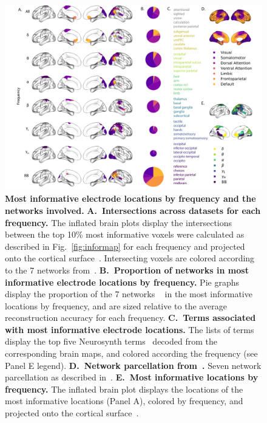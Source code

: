 \documentclass[11pt]{article}
\begin{document}
\begin{figure}
  \centering
  \includegraphics[width=\textwidth]{figs/networks}
  \caption{\textbf{Most informative electrode locations by frequency
      and the networks involved.}
    \textbf{A.~Intersections across datasets for each frequency.} The
    inflated brain plots display the intersections between the
    top 10\% most informative voxels were calculated as described in Fig.~\ref{fig:informap}
    for each frequency and projected onto the cortical surface~\citep{CombEtal19}. Intersecting voxels are colored according to the 7 networks
    from~\citep{YeoEtal11}.
    \textbf{B.~Proportion of networks in most informative electrode locations by
    frequency.}  Pie graphs display the proportion of the 7 networks
  ~\citep{YeoEtal11} in the most informative locations by
  frequency, and are sized relative to the average reconstruction
  accuracy for each frequency. \textbf{C.~Terms associated with most informative
    electrode locations.}  The
    lists of terms display the top five Neurosynth
    terms~\citep{RubiEtal17} decoded from the corresponding brain
    maps, and colored according the frequency (see Panel
    E legend). \textbf{D.~Network parcellation from~\citep{YeoEtal11}.}
    Seven network parcellation as described
    in~\citep{YeoEtal11}. \textbf{E.~Most informative locations by
      frequency.} The inflated brain plot displays the locations of
    the most informative locations (Panel A), colored by frequency,
    and projected onto the cortical surface~\citep{CombEtal19}.}
  \label{fig:networks}
\end{figure}
\end{document}
